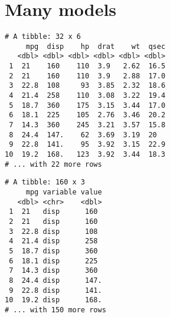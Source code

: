 \documentclass[12pt,letterpaperpaper,openany]{book}
\newenvironment{Shaded}{\begin{snugshade}}{\end{snugshade}}
\newcommand{\DataTypeTok}[1]{\textcolor[rgb]{0.13,0.29,0.53}{#1}}
\newcommand{\KeywordTok}[1]{\textcolor[rgb]{0.13,0.29,0.53}{\textbf{#1}}}
\newcommand{\NormalTok}[1]{#1}
\newcommand{\OperatorTok}[1]{\textcolor[rgb]{0.81,0.36,0.00}{\textbf{#1}}}
\newcommand{\StringTok}[1]{\textcolor[rgb]{0.31,0.60,0.02}{#1}}
\begin{document}
\hypertarget{many-models}{%
\section{Many models}\label{many-models}}

\begin{Shaded}
\end{Shaded}

\begin{verbatim}
# A tibble: 32 x 6
     mpg  disp    hp  drat    wt  qsec
   <dbl> <dbl> <dbl> <dbl> <dbl> <dbl>
 1  21    160    110  3.9   2.62  16.5
 2  21    160    110  3.9   2.88  17.0
 3  22.8  108     93  3.85  2.32  18.6
 4  21.4  258    110  3.08  3.22  19.4
 5  18.7  360    175  3.15  3.44  17.0
 6  18.1  225    105  2.76  3.46  20.2
 7  14.3  360    245  3.21  3.57  15.8
 8  24.4  147.    62  3.69  3.19  20  
 9  22.8  141.    95  3.92  3.15  22.9
10  19.2  168.   123  3.92  3.44  18.3
# ... with 22 more rows
\end{verbatim}

\begin{Shaded}
\end{Shaded}

\begin{verbatim}
# A tibble: 160 x 3
     mpg variable value
   <dbl> <chr>    <dbl>
 1  21   disp      160 
 2  21   disp      160 
 3  22.8 disp      108 
 4  21.4 disp      258 
 5  18.7 disp      360 
 6  18.1 disp      225 
 7  14.3 disp      360 
 8  24.4 disp      147.
 9  22.8 disp      141.
10  19.2 disp      168.
# ... with 150 more rows
\end{verbatim}

\begin{Shaded}
\end{Shaded}
\end{document}
